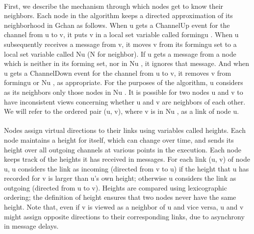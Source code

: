 \paragraph{}First, we describe the mechanism through which nodes get to know their neighbors. Each node in the algorithm keeps a directed approximation of its neighborhood in Gchan as follows. When u gets a ChannelUp event for the channel from u to v, it puts v in a local set variable called formingu . When u subsequently receives a message from v, it moves v from its formingu set to a local set variable called Nu (N for neighbor). If u gets a message from a node which is neither in its forming set, nor in Nu , it ignores that message. And when u gets a ChannelDown event for the channel from u to v, it removes v from formingu or Nu , as appropriate. For the purposes of the algorithm, u considers as its neighbors only those nodes in Nu . It is possible for two nodes u and v to have inconsistent views concerning whether u and v are neighbors of each other. We will refer to the ordered pair (u, v), where v is in Nu , as a link of node u.
\paragraph{}Nodes assign virtual directions to their links using variables called heights. Each node maintains a height for itself, which can change over time, and sends its height over all outgoing channels at various points in the execution. Each node keeps track of the heights it has received in messages. For each link (u, v) of node u, u considers the link as incoming (directed from v to u) if the height that u has recorded for v is larger than u’s own height; otherwise u considers the link as outgoing (directed from u to v). Heights are compared using lexicographic ordering; the definition of height ensures that two nodes never have the same height. Note that, even if v is viewed as a neighbor of u and vice versa, u and v might assign opposite directions to their corresponding links, due to asynchrony in message delays.
